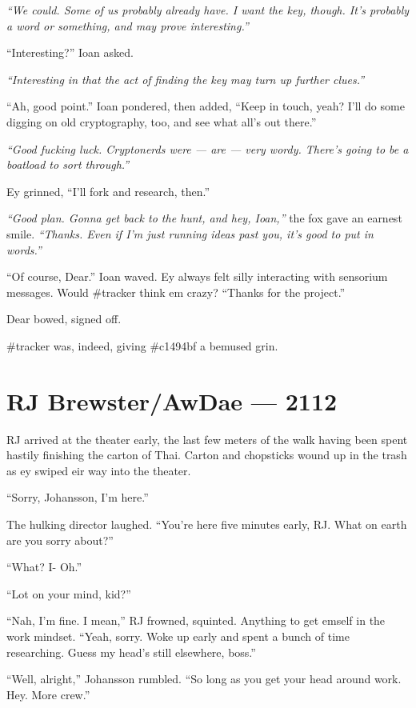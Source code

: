 \emph{``We could. Some of us probably already have. I want the key, though. It's probably a word or something, and may prove interesting.''}

``Interesting?'' Ioan asked.

\emph{``Interesting in that the act of finding the key may turn up further clues.''}

``Ah, good point.'' Ioan pondered, then added, ``Keep in touch, yeah? I'll do some digging on old cryptography, too, and see what all's out there.''

\emph{``Good fucking luck. Cryptonerds were --- are --- very wordy. There's going to be a boatload to sort through.''}

Ey grinned, ``I'll fork and research, then.''

\emph{``Good plan. Gonna get back to the hunt, and hey, Ioan,''} the fox gave an earnest smile. \emph{``Thanks. Even if I'm just running ideas past you, it's good to put in words.''}

``Of course, Dear.'' Ioan waved. Ey always felt silly interacting with sensorium messages. Would \#tracker think em crazy? ``Thanks for the project.''

Dear bowed, signed off.

\#tracker was, indeed, giving \#c1494bf a bemused grin.

\chapter*{RJ Brewster/AwDae — 2112}

RJ arrived at the theater early, the last few meters of the walk having been spent hastily finishing the carton of Thai. Carton and chopsticks wound up in the trash as ey swiped eir way into the theater.

``Sorry, Johansson, I'm here.''

The hulking director laughed. ``You're here five minutes early, RJ. What on earth are you sorry about?''

``What? I- Oh.''

``Lot on your mind, kid?''

``Nah, I'm fine. I mean,'' RJ frowned, squinted. Anything to get emself in the work mindset. ``Yeah, sorry. Woke up early and spent a bunch of time researching. Guess my head's still elsewhere, boss.''

``Well, alright,'' Johansson rumbled. ``So long as you get your head around work. Hey. More crew.''

